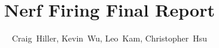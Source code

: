 \documentclass[journal]{IEEEtran}
\begin{document}

%
\title{Nerf Firing Final Report}
%
%
%

\author{Craig~Hiller,
Kevin~Wu,
        Leo~Kam, Christopher~Hsu}%

% 
%



%
{}
% 

\maketitle
\end{document}
